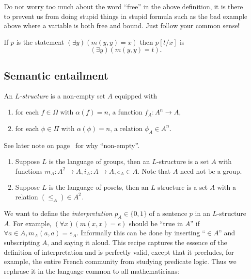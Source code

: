 \documentclass[a4paper]{article}
\begin{document}
Do not worry too much about the word ``free'' in the above definition, it is there to prevent us from doing stupid things in stupid formula such as the bad example above where a variable is both free and bound. Just follow your common sense!

\begin{eg}
  If \(p\) is the statement \((\exists y) (m(y, y) = x)\) then \(p[t/x]\) is
  \[
    (\exists y) (m(y, y) = t).
  \]
\end{eg}

\subsection{Semantic entailment}

\begin{definition}[\(L\)-structure]
  An \emph{\(L\)-structure} is a non-empty set \(A\) equipped with
  \begin{enumerate}
  \item for each \(f \in \Omega\) with \(\alpha(f) = n\), a function \(f_A: A^n \to A\),
  \item for each \(\phi \in \Pi\) with \(\alpha(\phi) = n\), a relation \(\phi_A \in A^n\).
  \end{enumerate}
\end{definition}

See later note on page~\pageref{note:empty structure} for why ``non-empty''.

\begin{eg}\leavevmode
  \begin{enumerate}
  \item Suppose \(L\) is the language of groups, then an \(L\)-structure is a set \(A\) with functions \(m_A: A^2 \to A, i_A: A \to A, e_A \in A\). Note that \(A\) need not be a group.
  \item Suppose \(L\) is the language of posets, then an \(L\)-structure is a set \(A\) with a relation \((\leq_A) \in A^2\).
  \end{enumerate}
\end{eg}

We want to define the \emph{interpretation} \(p_A \in \{0, 1\}\) of a sentence \(p\) in an \(L\)-structure \(A\). For example, \((\forall x) (m(x, x) = e)\) should be ``true in \(A\)'' if \(\forall a \in A, m_A(a, a) = e_A\). Informally this can be done by inserting ``\(\in A\)'' and subscripting \(A\), and saying it aloud. This recipe captures the essence of the definition of interpretation and is perfectly valid, except that it precludes, for example, the entire French community from studying predicate logic. Thus we rephrase it in the language common to all mathematicians:
\end{document}
